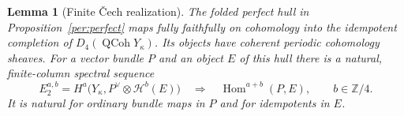 \documentclass[11pt]{article}
\newtheorem{lemma}[theorem]{Lemma}
\theoremstyle{definition}
\theoremstyle{remark}
\newcommand{\Z}{\mathbb Z}
\DeclareMathOperator{\Hom}{Hom}
\numberwithin{equation}{section}
\begin{document}
\begin{lemma}[Finite \v Cech realization]
\label{per:coherent}
The folded perfect hull in Proposition~\ref{per:perfect} maps fully
faithfully on cohomology into the idempotent completion of
$D_4(\operatorname{QCoh}Y_\kappa)$.  Its objects have coherent
periodic cohomology sheaves.  For a vector bundle $P$ and an object
$E$ of this hull there is a natural, finite-column spectral sequence
\begin{equation}
 E_2^{a,b}
   =H^a\bigl(Y_\kappa,P^\vee\otimes\mathcal H^b(E)\bigr)
   \quad\Longrightarrow\quad \Hom^{a+b}(P,E),
 \qquad b\in\Z/4.
 \label{per:spectral-sequence}
\end{equation}
It is natural for ordinary bundle maps in $P$ and for idempotents
in $E$.
\end{lemma}
\end{document}
